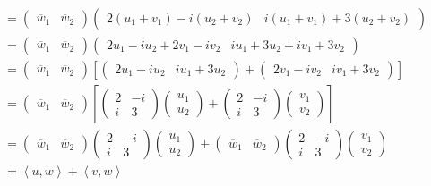 \begin{questions}
\begin{solution}
\begin{itemize}
\begin{align*}
&=\begin{pmatrix}
\overline{w}_1&\overline{w}_2
\end{pmatrix}\begin{pmatrix}
2(u_1+v_1)-i(u_2+v_2)&i(u_1+v_1)+3(u_2+v_2)
\end{pmatrix}\\
&=\begin{pmatrix}
\overline{w}_1&\overline{w}_2
\end{pmatrix}\begin{pmatrix}
2u_1-iu_2+2v_1-iv_2&iu_1+3u_2+iv_1+3v_2
\end{pmatrix}\\
&=\begin{pmatrix}
\overline{w}_1&\overline{w}_2
\end{pmatrix}\left[\begin{pmatrix}
2u_1-iu_2&iu_1+3u_2\end{pmatrix}+\begin{pmatrix}
2v_1-iv_2&iv_1+3v_2
\end{pmatrix}\right]\\
&=\begin{pmatrix}
\overline{w}_1&\overline{w}_2
\end{pmatrix}\left[\begin{pmatrix}
2&-i\\i&3
\end{pmatrix}\begin{pmatrix}
u_1\\u_2
\end{pmatrix}+\begin{pmatrix}
2&-i\\i&3
\end{pmatrix}\begin{pmatrix}
v_1\\v_2
\end{pmatrix}\right]\\
&=\begin{pmatrix}
\overline{w}_1&\overline{w}_2
\end{pmatrix}\begin{pmatrix}
2&-i\\i&3
\end{pmatrix}\begin{pmatrix}
u_1\\u_2
\end{pmatrix}+\begin{pmatrix}
\overline{w}_1&\overline{w}_2
\end{pmatrix}\begin{pmatrix}
2&-i\\i&3
\end{pmatrix}\begin{pmatrix}
v_1\\v_2
\end{pmatrix}\\
&=\left<u,w\right>+\left<v,w\right>
\end{align*}
\end{itemize}
\end{solution}
\end{questions}
